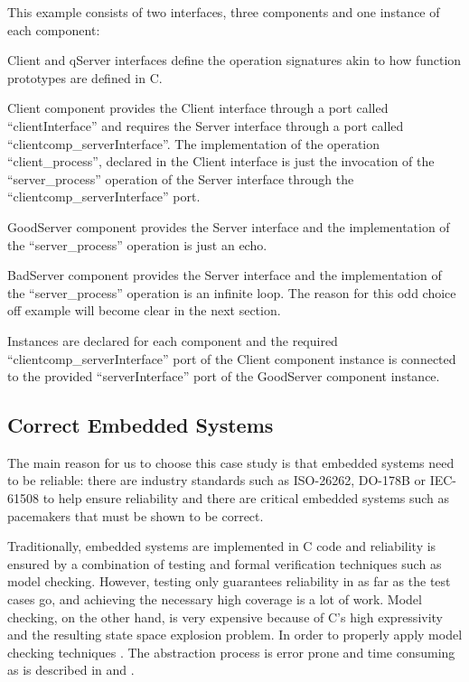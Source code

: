
This example consists of two interfaces, three components and one instance of
each component:
\begin{compactdesc}
\item[Client and qServer interfaces] define the operation signatures akin to how
function prototypes are defined in C.

\item[Client component] provides the Client interface through a port called
``clientInterface'' and requires the Server interface through a port called
``clientcomp\_serverInterface''. The implementation of the operation
``client\_process'', declared in the Client interface is just the invocation of
the ``server\_process'' operation of the Server interface through the
``clientcomp\_serverInterface'' port.

\item[GoodServer component] provides the Server interface and the implementation
of the ``server\_process'' operation is just an echo.

\item[BadServer component] provides the Server interface and the implementation
of the ``server\_process'' operation is an infinite loop. The reason for this
odd choice off example will become clear in the next section.

\item[Instances] are declared for each component and the required
``clientcomp\_serverInterface'' port of the Client component instance is
connected to the provided ``serverInterface'' port of the GoodServer component
instance.
\end{compactdesc}


\subsection{Correct Embedded Systems}

The main reason for us to choose this case study is that embedded systems need
to be reliable: there are industry standards such as ISO-26262, DO-178B or
IEC-61508 to help ensure reliability and there are critical embedded systems
such as pacemakers \cite{mry_et_al:DR:2014:4543} that must be shown to be
correct.

Traditionally, embedded systems are implemented in C code and reliability is
ensured by a combination of testing and formal verification techniques such as
model checking. However, testing only guarantees reliability in as far as the
test cases go, and achieving the necessary high coverage is a lot of work.
Model checking, on the other hand, is very expensive because of C's high
expressivity and the resulting state space explosion problem. In order to
properly apply model checking techniques \cite{Ivancic2005}.
The abstraction process is error prone and time consuming as is described in
\cite{Corbett2000} and \cite{Ratiu:2012:LEE:2663689.2663692}.

